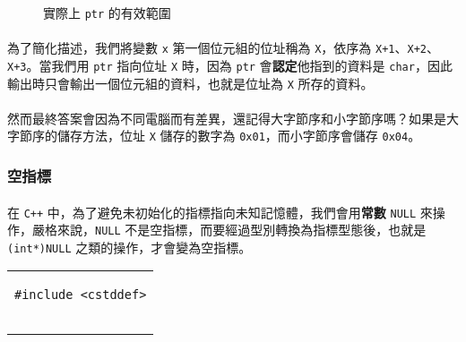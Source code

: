 \documentclass[12pt,a4paper,oneside]{report}
\begin{document}
\begin{CJK}{UTF8}{bkai}
\begin{figure}[h!]
\centering
{}
\caption{實際上 \lstinline!ptr! 的有效範圍}
\label{program:struct:fig:pointer:type}
\end{figure}

\paragraph{}為了簡化描述，我們將變數 \lstinline!x! 第一個位元組的位址稱為 \texttt{X}，依序為 \texttt{X+1}、\texttt{X+2}、\texttt{X+3}。當我們用 \lstinline!ptr! 指向位址 \lstinline!X! 時，因為 \lstinline!ptr! 會\textbf{認定}他指到的資料是 \lstinline!char!，因此輸出時只會輸出一個位元組的資料，也就是位址為 \lstinline!X! 所存的資料。
\paragraph{}然而最終答案會因為不同電腦而有差異，還記得大字節序和小字節序嗎？如果是大字節序的儲存方法，位址 \lstinline!X! 儲存的數字為 \texttt{0x01}，而小字節序會儲存 \texttt{0x04}。

\subsubsection{空指標}

\paragraph{}在 \texttt{C++} 中，為了避免未初始化的指標指向未知記憶體，我們會用\textbf{常數} \lstinline!NULL! 來操作，嚴格來說，\lstinline!NULL! 不是空指標，而要經過型別轉換為指標型態後，也就是 \lstinline!(int*)NULL! 之類的操作，才會變為空指標。

\begin{code}[h!]
\centering
\begin{tabular}{c}
\begin{lstlisting}
#include <cstddef>


\end{lstlisting}
\end{tabular}
\end{code}
\end{CJK}
\end{document}
